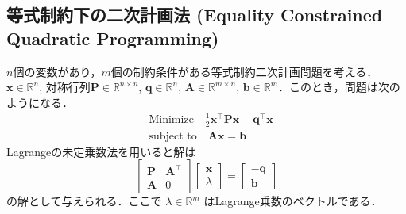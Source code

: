 \subsection{等式制約下の二次計画法 (Equality Constrained Quadratic Programming)}$n$個の変数があり，$m$個の制約条件がある等式制約二次計画問題を考える．$\mathbf {x}\in \mathbb{R}^n$, 対称行列$\mathbf{P}\in \mathbb{R}^{n\times n}$,  $\mathbf {q}\in \mathbb{R}^{n}$, $\mathbf{A}\in \mathbb{R}^{m\times n}$, $\mathbf {b}\in \mathbb{R}^m$．このとき，問題は次のようになる．
$$
\begin{align}
&{\text{Minimize}}\quad {\frac {1}{2}}\mathbf {x}^\top \mathbf{P}\mathbf {x} +\mathbf {q} ^{\top}\mathbf {x}\\
&{\text{subject to}}\quad \mathbf{A}\mathbf {x} =\mathbf {b}
\end{align}
$$
Lagrangeの未定乗数法を用いると解は
$$
{\begin{bmatrix}\mathbf{P}&\mathbf{A}^\top\\\mathbf{A}&0\end{bmatrix}}{\begin{bmatrix}\mathbf {x} \\
\lambda \end{bmatrix}}={\begin{bmatrix}-\mathbf {q} \\\mathbf {b} \end{bmatrix}}
$$
の解として与えられる．ここで $\lambda \in \mathbb{R}^{m}$  はLagrange乗数のベクトルである．